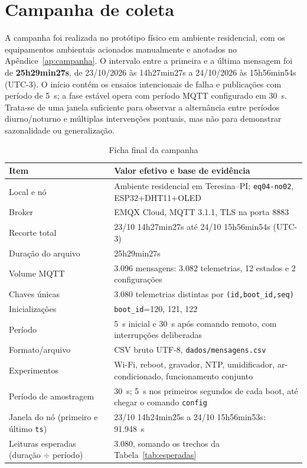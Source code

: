 \section{Campanha de coleta}\label{sec:campanha}
A campanha foi realizada no protótipo físico em ambiente residencial, com os equipamentos ambientais acionados manualmente e anotados no Apêndice~\ref{ap:campanha}. O intervalo entre a primeira e a última mensagem foi de \textbf{25h29min27s}, de 23/10/2026 às 14h27min27s a 24/10/2026 às 15h56min54s (UTC-3). O início contém os ensaios intencionais de falha e publicações com período de 5~s; a fase estável opera com período MQTT configurado em 30~s. Trata-se de uma janela suficiente para observar a alternância entre períodos diurno/noturno e múltiplas intervenções pontuais, mas não para demonstrar sazonalidade ou generalização.
\begin{table}[H]\centering\caption{Ficha final da campanha}\label{tab:campanha}\footnotesize
\begin{tabular}{@{}L{4.25cm}L{9.75cm}@{}}\toprule
Item&Valor efetivo e base de evidência\\\midrule
Local e nó&Ambiente residencial em Teresina--PI; \texttt{eq04-no02}, ESP32+DHT11+OLED\\
Broker&EMQX Cloud, MQTT 3.1.1, TLS na porta 8883\\
Recorte total&23/10 14h27min27s até 24/10 15h56min54s (UTC-3)\\
Duração do arquivo&25h29min27s\\
Volume MQTT&3.096 mensagens: 3.082 telemetrias, 12 estados e 2 configurações\\
Chaves únicas&3.080 telemetrias distintas por \texttt{(id,boot\_id,seq)}\\
Inicializações&\texttt{boot\_id}=120, 121, 122\\
Período&5~s inicial e 30~s após comando remoto, com interrupções deliberadas\\
Formato/arquivo&CSV bruto UTF-8, \texttt{dados/mensagens.csv}\\
Experimentos&Wi-Fi, reboot, gravador, NTP, umidificador, ar-condicionado, funcionamento conjunto\\
Período de amostragem&30~s; 5~s nos primeiros segundos de cada boot, até chegar o comando \texttt{config}\\
Janela do nó (primeiro e último \texttt{ts})&23/10 14h24min25s a 24/10 15h56min53s: 91.948~s\\
Leituras esperadas (duração $\div$ período)&3.080, somando os trechos da Tabela~\ref{tab:esperadas}\\

\end{tabular}
\end{table}
